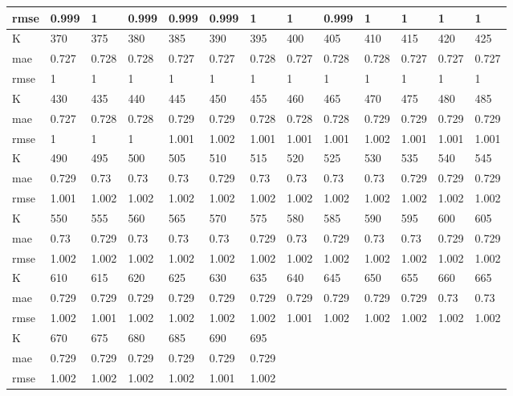 \begin{appendices}
\begin{center}
\begin{tabularx}{\textwidth}{|l|X|X|X|X|X|X|X|X|X|X|X|X|}
		rmse & 0.999 & 1 & 0.999 & 0.999 & 0.999 & 1 & 1 & 0.999 & 1 & 1 & 1 & 1 \\ \hline 
		\hline 
		K & 370 & 375 & 380 & 385 & 390 & 395 & 400 & 405 & 410 & 415 & 420 & 425 \\ \hline 
		mae & 0.727 & 0.728 & 0.728 & 0.727 & 0.727 & 0.728 & 0.727 & 0.728 & 0.728 & 0.727 & 0.727 & 0.727 \\ \hline 
		rmse & 1 & 1 & 1 & 1 & 1 & 1 & 1 & 1 & 1 & 1 & 1 & 1 \\ \hline 
		\hline 
		K & 430 & 435 & 440 & 445 & 450 & 455 & 460 & 465 & 470 & 475 & 480 & 485 \\ \hline 
		mae & 0.727 & 0.728 & 0.728 & 0.729 & 0.729 & 0.728 & 0.728 & 0.728 & 0.729 & 0.729 & 0.729 & 0.729 \\ \hline 
		rmse & 1 & 1 & 1 & 1.001 & 1.002 & 1.001 & 1.001 & 1.001 & 1.002 & 1.001 & 1.001 & 1.001 \\ \hline 
		\hline 
		K & 490 & 495 & 500 & 505 & 510 & 515 & 520 & 525 & 530 & 535 & 540 & 545 \\ \hline 
		mae & 0.729 & 0.73 & 0.73 & 0.73 & 0.729 & 0.73 & 0.73 & 0.73 & 0.73 & 0.729 & 0.729 & 0.729 \\ \hline 
		rmse & 1.001 & 1.002 & 1.002 & 1.002 & 1.002 & 1.002 & 1.002 & 1.002 & 1.002 & 1.002 & 1.002 & 1.002 \\ \hline 
		\hline 
		K & 550 & 555 & 560 & 565 & 570 & 575 & 580 & 585 & 590 & 595 & 600 & 605 \\ \hline 
		mae & 0.73 & 0.729 & 0.73 & 0.73 & 0.73 & 0.729 & 0.73 & 0.729 & 0.73 & 0.73 & 0.729 & 0.729 \\ \hline 
		rmse & 1.002 & 1.002 & 1.002 & 1.002 & 1.002 & 1.002 & 1.002 & 1.002 & 1.002 & 1.002 & 1.002 & 1.002 \\ \hline 
		\hline 
		K & 610 & 615 & 620 & 625 & 630 & 635 & 640 & 645 & 650 & 655 & 660 & 665 \\ \hline 
		mae & 0.729 & 0.729 & 0.729 & 0.729 & 0.729 & 0.729 & 0.729 & 0.729 & 0.729 & 0.729 & 0.73 & 0.73 \\ \hline 
		rmse & 1.002 & 1.001 & 1.002 & 1.002 & 1.002 & 1.002 & 1.001 & 1.002 & 1.002 & 1.002 & 1.002 & 1.002 \\ \hline 
		\hline 
		K & 670 & 675 & 680 & 685 & 690 & 695  & & & & & & \\ \hline 
		mae & 0.729 & 0.729 & 0.729 & 0.729 & 0.729 & 0.729 & & & & & &  \\ \hline 
		rmse & 1.002 & 1.002 & 1.002 & 1.002 & 1.001 & 1.002  & & & & & & \\ \hline 
	\end{tabularx} 
\end{center}


\end{appendices}

